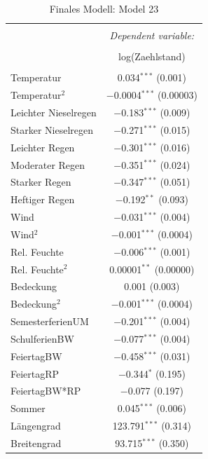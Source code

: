 \documentclass[a4paper,12pt]{thesis}
\begin{document}
\begin{table}[!htbp] \centering 
	\caption{Finales Modell: Model 23} 
	\label{FinalFinalModel} 
	\small 
	\begin{tabular}{@{\extracolsep{-15pt}}lc} 
		\\[-1.8ex]\hline 
		\hline \\[-1.8ex] 
		& \multicolumn{1}{c}{\textit{Dependent variable:}} \\ 
		\cline{2-2} 
		\\[-1.8ex] & log(Zaehlstand) \\ 
		\hline \\[-1.8ex] 
		Temperatur & 0.034$^{***}$ (0.001) \\ 
		Temperatur$^2$ & $-$0.0004$^{***}$ (0.00003) \\ 
		Leichter Nieselregen & $-$0.183$^{***}$ (0.009) \\ 
		Starker Nieselregen & $-$0.271$^{***}$ (0.015) \\ 
		Leichter Regen & $-$0.301$^{***}$ (0.016) \\ 
		Moderater Regen & $-$0.351$^{***}$ (0.024) \\ 
		Starker Regen & $-$0.347$^{***}$ (0.051) \\ 
		Heftiger Regen & $-$0.192$^{**}$ (0.093) \\ 
		Wind & $-$0.031$^{***}$ (0.004) \\ 
		Wind$^2$ & $-$0.001$^{***}$ (0.0004) \\ 
		Rel. Feuchte & $-$0.006$^{***}$ (0.001) \\ 
		Rel. Feuchte$^2$ & 0.00001$^{**}$ (0.00000) \\ 
		Bedeckung & 0.001 (0.003) \\ 
		Bedeckung$^2$ & $-$0.001$^{***}$ (0.0004) \\ 
		SemesterferienUM & $-$0.201$^{***}$ (0.004) \\ 
		SchulferienBW & $-$0.077$^{***}$ (0.004) \\ 
		FeiertagBW & $-$0.458$^{***}$ (0.031) \\ 
		FeiertagRP & $-$0.344$^{*}$ (0.195) \\ 
		FeiertagBW*RP & $-$0.077 (0.197) \\ 
		Sommer & 0.045$^{***}$ (0.006) \\ 
		Längengrad & 123.791$^{***}$ (0.314) \\ 
		Breitengrad & 93.715$^{***}$ (0.350) \\ 

\end{tabular}
\end{table}
\end{document}
